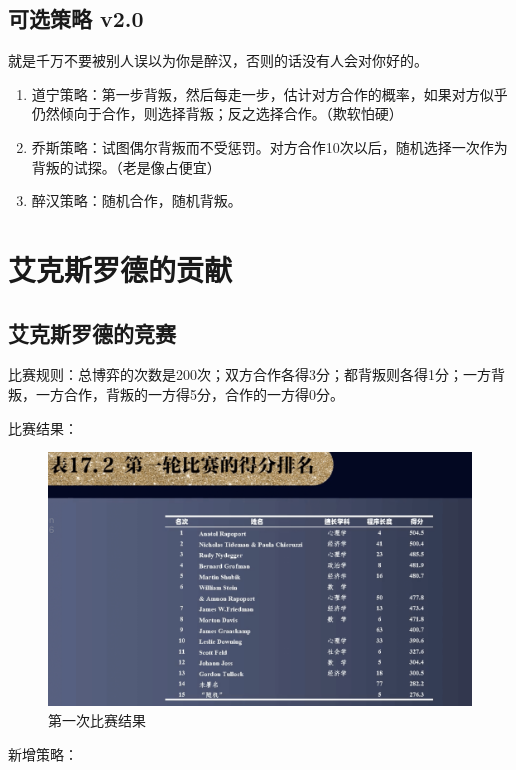 \documentclass[12pt, a4paper]{article}
\begin{document}
\begin{CJK*}{UTF8}{gbsn}
        \subsection{可选策略 v2.0}
        就是千万不要被别人误以为你是醉汉，否则的话没有人会对你好的。
        \begin{enumerate}
            \item 道宁策略：第一步背叛，然后每走一步，估计对方合作的概率，如果对方似乎仍然倾向于合作，则选择背叛；反之选择合作。（欺软怕硬）
            \item 乔斯策略：试图偶尔背叛而不受惩罚。对方合作10次以后，随机选择一次作为背叛的试探。（老是像占便宜）
            \item 醉汉策略：随机合作，随机背叛。
        \end{enumerate}

        \section{艾克斯罗德的贡献}
        \subsection{艾克斯罗德的竞赛}

        比赛规则：总博弈的次数是200次；双方合作各得3分；都背叛则各得1分；一方背叛，一方合作，背叛的一方得5分，合作的一方得0分。

        比赛结果：
        \begin{figure}[htbp]
            \centering
            \includegraphics[width=1\textwidth]{./figures/catch2023-08-02-10.04.06.png}
            \caption{第一次比赛结果}
        \end{figure}

        新增策略：


\end{CJK*}
\end{document}
